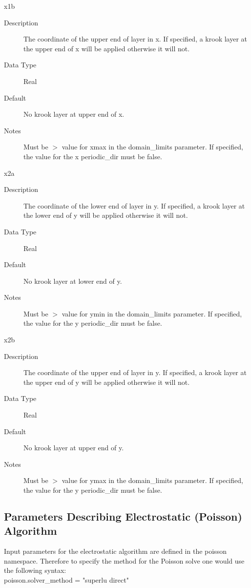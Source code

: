 \documentclass[11pt]{amsart}
\begin{document}
x1b
\begin{description}
\item [Description] The coordinate of the upper end of layer in x.  If
specified, a krook layer at the upper end of x will be applied otherwise it
will not.
\item [Data Type] Real
\item [Default] No krook layer at upper end of x.
\item [Notes] Must be $>$ value for xmax in the domain\_limits parameter.  If
specified, the value for the x periodic\_dir must be false.
\end{description}

x2a
\begin{description}
\item [Description] The coordinate of the lower end of layer in y.  If
specified, a krook layer at the lower end of y will be applied otherwise it
will not.
\item [Data Type] Real
\item [Default] No krook layer at lower end of y.
\item [Notes] Must be $>$ value for ymin in the domain\_limits parameter.  If
specified, the value for the y periodic\_dir must be false.
\end{description}

x2b
\begin{description}
\item [Description] The coordinate of the upper end of layer in y.  If
specified, a krook layer at the upper end of y will be applied otherwise it
will not.
\item [Data Type] Real
\item [Default] No krook layer at upper end of y.
\item [Notes] Must be $>$ value for ymax in the domain\_limits parameter.  If
specified, the value for the y periodic\_dir must be false.
\end{description}

\subsection*{Parameters Describing Electrostatic (Poisson) Algorithm}
Input parameters for the electrostatic algorithm are defined in the poisson
namespace.  Therefore to specify the method for the Poisson solve one would use
the following syntax: \\
poisson.solver\_method = "superlu direct"
\end{document}
